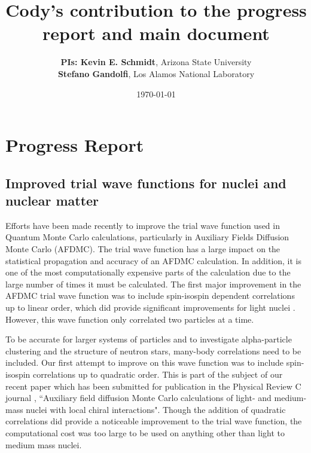 \documentclass[12pt,letterpaper]{article}
\begin{document}
\onehalfspacing
\title{{\Large \textbf{Cody's contribution to the progress report and main document}} \vspace{-0.5cm}}
\author{
{\bf PIs: Kevin E. Schmidt}, Arizona State University \\
{\bf Stefano Gandolfi}, Los Alamos National Laboratory
}
\date{\today}
\maketitle

\vspace{-1.5cm}
\section{Progress Report}
\subsection{Improved trial wave functions for nuclei and nuclear matter}
Efforts have been made recently to improve the trial wave function used in Quantum Monte Carlo calculations, particularly in Auxiliary Fields Diffusion Monte Carlo (AFDMC). The trial wave function has a large impact on the statistical propagation and accuracy of an AFDMC calculation. In addition, it is one of the most computationally expensive parts of the calculation due to the large number of times it must be calculated. The first major improvement in the AFDMC trial wave function was to include spin-isospin dependent correlations up to linear order, which did provide significant improvements for light nuclei \cite{gan14}. However, this wave function only correlated two particles at a time.

To be accurate for larger systems of particles and to investigate alpha-particle clustering and the structure of neutron stars, many-body correlations need to be included. Our first attempt to improve on this wave function was to include spin-isospin correlations up to quadratic order. This is part of the subject of our recent paper which has been submitted for publication in the Physical Review C journal \cite{lon18}, ``Auxiliary field diffusion Monte Carlo calculations of light- and medium-mass nuclei with local chiral interactions". Though the addition of quadratic correlations did provide a noticeable improvement to the trial wave function, the computational cost was too large to be used on anything other than light to medium mass nuclei.
\end{document}
